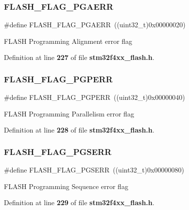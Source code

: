 \subsubsection{F\+L\+A\+S\+H\+\_\+\+F\+L\+A\+G\+\_\+\+P\+G\+A\+E\+RR}
{\footnotesize\ttfamily \#define F\+L\+A\+S\+H\+\_\+\+F\+L\+A\+G\+\_\+\+P\+G\+A\+E\+RR~((uint32\+\_\+t)0x00000020)}

F\+L\+A\+SH Programming Alignment error flag 

Definition at line \textbf{ 227} of file \textbf{ stm32f4xx\+\_\+flash.\+h}.

\mbox{\label{group__FLASH__Flags_ga88a93907641f5eeb4091a26b84c94897}} 
\subsubsection{F\+L\+A\+S\+H\+\_\+\+F\+L\+A\+G\+\_\+\+P\+G\+P\+E\+RR}
{\footnotesize\ttfamily \#define F\+L\+A\+S\+H\+\_\+\+F\+L\+A\+G\+\_\+\+P\+G\+P\+E\+RR~((uint32\+\_\+t)0x00000040)}

F\+L\+A\+SH Programming Parallelism error flag 

Definition at line \textbf{ 228} of file \textbf{ stm32f4xx\+\_\+flash.\+h}.

\mbox{\label{group__FLASH__Flags_ga25b80c716320e667162846da8be09b68}} 
\subsubsection{F\+L\+A\+S\+H\+\_\+\+F\+L\+A\+G\+\_\+\+P\+G\+S\+E\+RR}
{\footnotesize\ttfamily \#define F\+L\+A\+S\+H\+\_\+\+F\+L\+A\+G\+\_\+\+P\+G\+S\+E\+RR~((uint32\+\_\+t)0x00000080)}

F\+L\+A\+SH Programming Sequence error flag 

Definition at line \textbf{ 229} of file \textbf{ stm32f4xx\+\_\+flash.\+h}.

